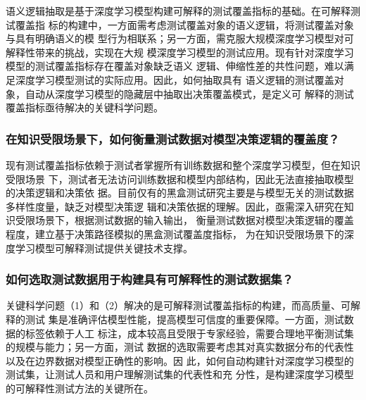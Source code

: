 语义逻辑抽取是基于深度学习模型构建可解释的测试覆盖指标的基础。在可解释测试覆盖指
标的构建中，一方面需考虑测试覆盖对象的语义逻辑，将测试覆盖对象与具有明确语义的模
型行为相联系；另一方面，需克服大规模深度学习模型对可解释性带来的挑战，实现在大规
模深度学习模型的测试应用。现有针对深度学习模型的测试覆盖指标存在覆盖对象缺乏语义
逻辑、伸缩性差的共性问题，难以满足深度学习模型测试的实际应用。因此，如何抽取具有
语义逻辑的测试覆盖对象，自动从深度学习模型的隐藏层中抽取出决策覆盖模式，是定义可
解释的测试覆盖指标亟待解决的关键科学问题。


\subsubsection{在知识受限场景下，如何衡量测试数据对模型决策逻辑的覆盖度？}
现有测试覆盖指标依赖于测试者掌握所有训练数据和整个深度学习模型，但在知识受限场景
下，测试者无法访问训练数据和模型内部结构，因此无法直接抽取模型的决策逻辑和决策依
据。目前仅有的黑盒测试研究主要是与模型无关的测试数据多样性度量，缺乏对模型决策逻
辑和决策依据的理解。因此，亟需深入研究在知识受限场景下，根据测试数据的输入输出，
衡量测试数据对模型决策逻辑的覆盖程度，建立基于决策路径模拟的黑盒测试覆盖度指标，
为在知识受限场景下的深度学习模型可解释测试提供关键技术支撑。


\subsubsection{如何选取测试数据用于构建具有可解释性的测试数据集？}
关键科学问题（1）和（2）解决的是可解释测试覆盖指标的构建，而高质量、可解释的测试
集是准确评估模型性能，提高模型可信度的重要保障。一方面，测试数据的标签依赖于人工
标注，成本较高且受限于专家经验，需要合理地平衡测试集的规模与能力；另一方面，测试
数据的选取需要考虑其对真实数据分布的代表性以及在边界数据对模型正确性的影响。因
此，如何自动构建针对深度学习模型的测试集，让测试人员和用户理解测试集的代表性和充
分性，是构建深度学习模型的可解释性测试方法的关键所在。

\iffalse
    \begin{figure}[htp]
        \begin{small}
            \begin{center}
                \texttt{[image: ch2\_WBtest.pdf]}
            \end{center}
            \caption{基于层次语义理解的白盒测试研究内容}
            \label{fig:ch2:WBtest}
        \end{small}
    \end{figure}


    \begin{figure}[htp]
        \begin{small}
            \begin{center}
                \texttt{[image: ch2\_TestSelection.pdf]}
            \end{center}
            \caption{可解释预测模型研究内容}
            \label{fig:ch2:testselection}
        \end{small}
    \end{figure}

\fi